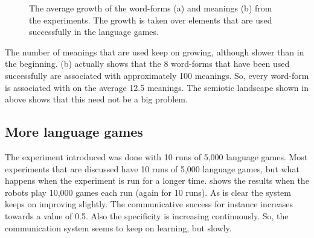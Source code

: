 \begin{figure}
	\centering
	\caption{The average growth of the word-forms (a) and meanings (b) from the experiments. The growth is taken over elements that are used successfully in the language games.}
	\label{f:st:growthlex}
\end{figure}

The number of meanings that are used keep on growing, although slower than in the beginning.  (b) actually shows that the 8 word-forms that have been used successfully are associated with approximately 100 meanings. So, every word-form is associated with on the average 12.5 meanings. The semiotic landscape shown in above shows that this need not be a big problem.

\subsection{More language games}\label{s:st:10000}

The experiment introduced was done with 10 runs of 5,000 language games. Most experiments that are discussed have 10 runs of 5,000 language games, but what happens when the experiment is run for a longer time.  shows the results when the robots play 10,000 games each run (again for 10 runs). As is clear the system keeps on improving slightly. The communicative success for instance increases towards a value of 0.5. Also the specificity is increasing continuously. So, the communication system seems to keep on learning, but slowly.

